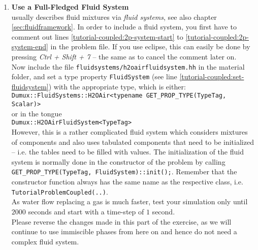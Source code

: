 \begin{enumerate}
\item \textbf{Use a Full-Fledged Fluid System} \\
\Dumux usually describes fluid mixtures via \textit{fluid systems}, see also chapter \ref{sec:fluidframework}. 
In order to include a fluid system, you first have to comment out lines \ref{tutorial-coupled:2p-system-start} 
to \ref{tutorial-coupled:2p-system-end} in the problem file. If you use eclipse, this can easily be done by pressing \textit{Ctrl + Shift + 7} -- 
the same as to cancel the comment later on.\\
Now include the file \texttt{fluidsystems/h2oairfluidsystem.hh} in the material folder, and set a type property \texttt{FluidSystem} (see line \ref{tutorial-coupled:set-fluidsystem})
with the appropriate type, which is either:\\
 \texttt{Dumux::FluidSystems::H2OAir<typename GET\_PROP\_TYPE(TypeTag, Scalar)>}\\
or in the \Dumux tongue\\
 \texttt{Dumux::H2OAirFluidSystem<TypeTag>}
\\
However, this is a rather complicated fluid system which 
considers mixtures of components and also uses tabulated components that need to be initialized -- i.e. the tables need to be filled with values. 
The initialization of the fluid system is normally done in the constructor of the problem by calling \texttt{GET\_PROP\_TYPE(TypeTag, FluidSystem)::init();}. 
Remember that the constructor function always has the same name as the respective class, i.e. \texttt{TutorialProblemCoupled(..)}.\\
As water flow replacing a gas is much faster, test your simulation only until $2000$ seconds and start with a time-step of $1$ second.\\
Please reverse the changes made in this part of the exercise, as we will continue to use immiscible phases from here on and hence do not need a complex fluid system.


\end{enumerate}
